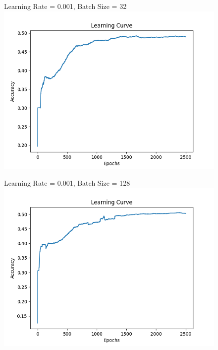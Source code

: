 \documentclass[12pt]{article}
\begin{document}
\begin{figure}[H]
    \begin{minipage}{0.45\textwidth}
        Learning Rate = 0.001, Batch Size = 32
        \includegraphics[width=\textwidth]{Batch_Size_32.png}
    \end{minipage}
    \hfill
    \begin{minipage}{0.45\textwidth}
        Learning Rate = 0.001, Batch Size = 128
        \includegraphics[width=\textwidth]{Batch_Size_128.png}
    \end{minipage}
\end{figure}

\vspace{20pt}

\end{document}
